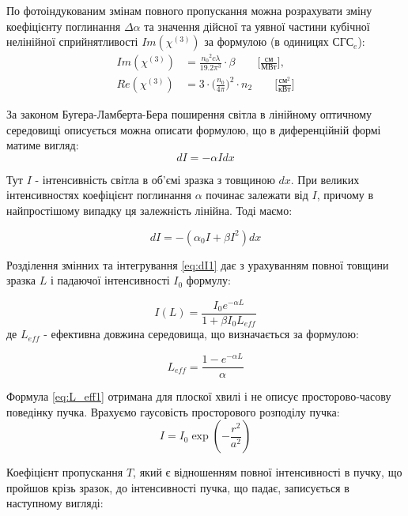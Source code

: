 По фотоіндукованим змінам повного пропускання можна розрахувати
зміну коефіцієнту поглинання $\Delta\alpha$ та значення дійсної та уявної частини кубічної
нелінійної сприйнятливості $Im(\chi^{(3)})$ за формулою (в одиницях СГС$_e$):
\begin{equation}\label{eq:Im_chi3}
\begin{split}
Im(\chi^{(3)}) &= \frac{{n_0}^2c\lambda}{19.2\pi^3} \cdot \beta \quad\quad \Big[\frac{\text{см}} {\text{МВт}} \Big], \\
Re(\chi^{(3)}) &= 3 \cdot \Big(\frac{n_0}{4\pi}\Big)^2 \cdot n_2 \quad\quad \Big[\frac{\text{см}^2} {\text{кВт}} \Big]
\end{split}
\end{equation}


За законом Бугера-Ламберта-Бера поширення світла в лінійному оптичному середовищі описується можна описати формулою, що в диференційній формі матиме вигляд:
\begin{equation}
dI = -\alpha I dx
\end{equation}

Тут $I$ - інтенсивність світла в об'ємі зразка з товщиною $dx$. При великих
інтенсивностях коефіцієнт поглинання $\alpha$ починає залежати від $I$, причому в
найпростішому випадку ця залежність лінійна. Тоді маємо:

\begin{equation}\label{eq:dI1}
dI = -(\alpha_0 I + \beta I^2 )dx
\end{equation}

Розділення змінних та інтегрування \ref{eq:dI1} дає з урахуванням повної товщини зразка $L$ і падаючої інтенсивності $I_0$ формулу:

\begin{equation}
I(L) = \frac{I_0 e^{-\alpha L}}{ 1 + \beta I_0 L_{eff}}
\end{equation}
де $L_{eff}$ - ефективна довжина середовища, що визначається за формулою:

\begin{equation}\label{eq:L_eff1}
L_{eff} = \frac{1-e^{-\alpha L}}{\alpha}
\end{equation}

Формула \ref{eq:L_eff1} отримана для плоскої хвилі і не описує просторово-часову поведінку пучка. Врахуємо гаусовість просторового розподілу пучка:
\begin{equation}
I = I_0 \exp{(-\frac{r^2}{a^2})}
\end{equation}
 
Коефіцієнт пропускання $T$, який є відношенням повної інтенсивності в пучку, що пройшов крізь зразок, до інтенсивності пучка, що падає, записується в наступному вигляді:


